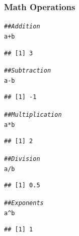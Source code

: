 \documentclass{beamer}\usepackage[]{graphicx}\usepackage[]{color}
\makeatletter
\newcommand{\hlcom}[1]{\textcolor[rgb]{0.678,0.584,0.686}{\textit{#1}}}%
\newcommand{\hlopt}[1]{\textcolor[rgb]{0,0,0}{#1}}%
\newcommand{\hlstd}[1]{\textcolor[rgb]{0.345,0.345,0.345}{#1}}%
\newenvironment{kframe}{%
 \def\at@end@of@kframe{}%
 \ifinner\ifhmode%
  \def\at@end@of@kframe{\end{minipage}}%
  \begin{minipage}{\columnwidth}%
 \fi\fi%
 \def\FrameCommand##1{\hskip\@totalleftmargin \hskip-\fboxsep
 \colorbox{shadecolor}{##1}\hskip-\fboxsep
     \hskip-\linewidth \hskip-\@totalleftmargin \hskip\columnwidth}%
 \MakeFramed {\advance\hsize-\width
   \@totalleftmargin\z@ \linewidth\hsize
   \@setminipage}}%
 {\par\unskip\endMakeFramed%
 \at@end@of@kframe}
\newenvironment{knitrout}{}{} %
\makeatother
\begin{document}
\begin{frame}[fragile]\frametitle{Math Operations}
\begin{knitrout}\footnotesize
{}\color{fgcolor}\begin{kframe}
\begin{alltt}
\hlcom{## Addition}
\hlstd{a} \hlopt{+} \hlstd{b}
\end{alltt}
\begin{verbatim}
## [1] 3
\end{verbatim}
\begin{alltt}
\hlcom{## Subtraction}
\hlstd{a} \hlopt{-} \hlstd{b}
\end{alltt}
\begin{verbatim}
## [1] -1
\end{verbatim}
\begin{alltt}
\hlcom{## Multiplication}
\hlstd{a} \hlopt{*} \hlstd{b}
\end{alltt}
\begin{verbatim}
## [1] 2
\end{verbatim}
\begin{alltt}
\hlcom{## Division}
\hlstd{a} \hlopt{/} \hlstd{b}
\end{alltt}
\begin{verbatim}
## [1] 0.5
\end{verbatim}
\begin{alltt}
\hlcom{## Exponents}
\hlstd{a}\hlopt{^}\hlstd{b}
\end{alltt}
\begin{verbatim}
## [1] 1
\end{verbatim}
\end{kframe}
\end{knitrout}
\end{frame}
\end{document}
